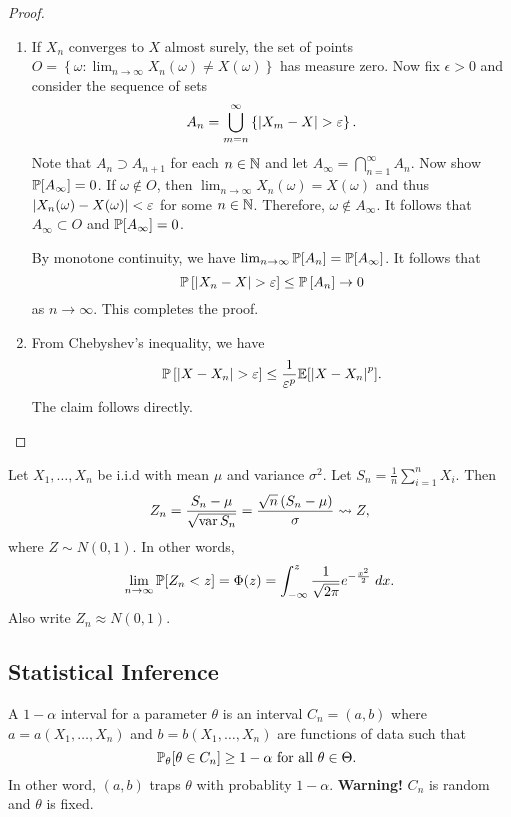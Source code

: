 \documentclass[a4paper]{article}
\begin{document}
\begin{proof}

\begin{enumerate}
  \item If $X_n$ converges to $X$ almost surely, 
  the set of points $O = \left\{ \omega : \lim_{n \to \infty}
  X_n(\omega) \neq X(\omega) \right\}$ has measure zero.
  Now fix $\epsilon > 0$ and consider the sequence of 
  sets 
  \[
  A_n = \bigcup_{m = n}^\infty \left\{ \abs{X_m - X} > \epsilon \right\}.
  \]
  Note that $A_n \supset A_{n+1}$ for each $n \in \N$ and 
  let $A_\infty = \bigcap_{n=1}^\infty A_n$. 
  Now show $\P[A_\infty] = 0$. If $\omega \notin O$, then 
  $\lim_{n \to \infty} X_n (\omega) = X(\omega)$ and thus 
  $\abs{X_n(\omega) - X(\omega)} < \epsilon$ for some $n \in \N$.
  Therefore, $\omega \notin A_\infty$.
  It follows that $A_\infty \subset O$ and $\P[A_\infty] = 0$. 
  
  By monotone 
  continuity, we have $\lim_{n \to \infty} \P[A_n] = 
  \P[A_\infty]$. It follows that
  \[
  \P \left[ \abs{X_n - X} > \epsilon \right] 
  \leq \P \left[ A_n \right] \to 0 
  \]
  as $n \to \infty$. This completes the proof.

  \item From Chebyshev's inequality, we have 
  \[
  \Prob \left[ \abs{X - X_n} > \epsilon \right] \leq 
  \frac{1}{\epsilon^p} \E [\abs{X - X_n}^p].
  \]
  The claim follows directly.
\end{enumerate}

\end{proof}

\begin{thm}
  Let $X_1, \dots, X_n$ be i.i.d with mean $\mu$ and variance 
  $\sigma^2$. Let $S_n = \frac{1}{n} \sum_{i=1}^n X_i$.
  Then 
  \[
  Z_n = \frac{S_n - \mu}{\sqrt{\var S_n}}
  = \frac{\sqrt{n} \left( S_n - \mu \right)}{\sigma} 
  \convDist Z,
  \]
  where $Z \sim N(0, 1)$. In other words, 
  \[
  \lim_{n \to \infty} \P[Z_n < z] = \Phi(z) 
  = \int_{-\infty}^z \frac{1}{\sqrt{2\pi}} e^{- \frac{x^2}{2}} 
  \; dx.
  \]
  Also write $Z_n \approx N(0, 1)$.
\end{thm}

\subsection{Statistical Inference}

\begin{defi}
  A $1 - \alpha$ interval for a parameter $\theta$ is 
  an interval $C_n = (a, b)$ where 
  $a = a(X_1, \dots, X_n)$ and $b = b(X_1, \dots, X_n)$
  are functions of data such that 
  \[
  \P_\theta[\theta \in C_n] \geq 1 - \alpha 
  \text{ for all $\theta \in \Theta$. }
  \]
  In other word, $(a, b)$ traps $\theta$ with probablity 
  $1 - \alpha$. 
  \textbf{Warning!} $C_n$ is random and $\theta$ is fixed.
\end{defi}
\end{document}
